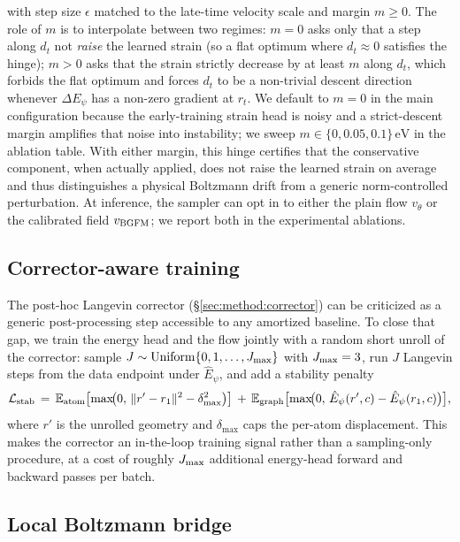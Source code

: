 \documentclass{article}
\begin{document}
with step size $\epsilon$ matched to the late-time velocity scale and
margin $m \ge 0$. The role of $m$ is to interpolate between two
regimes: $m = 0$ asks only that a step along $d_t$ not \emph{raise} the
learned strain (so a flat optimum where $d_t \approx 0$ satisfies the
hinge); $m > 0$ asks that the strain strictly decrease by at least $m$
along $d_t$, which forbids the flat optimum and forces $d_t$ to be a
non-trivial descent direction whenever $\Delta E_\psi$ has a non-zero
gradient at $r_t$. We default to $m = 0$ in the main configuration
because the early-training strain head is noisy and a strict-descent
margin amplifies that noise into instability; we sweep $m \in
\{0, 0.05, 0.1\}\,\mathrm{eV}$ in the ablation table. With either
margin, this hinge certifies that the conservative component, when
actually applied, does not raise the learned strain on average and thus
distinguishes a physical Boltzmann drift from a generic norm-controlled
perturbation. At inference, the sampler can opt in to either the plain
flow $v_\theta$ or the calibrated field $v_{\rm BGFM}$; we report both
in the experimental ablations.

\subsection{Corrector-aware training}
\label{sec:method:corrector-aware}

The post-hoc Langevin corrector (\S\ref{sec:method:corrector}) can be
criticized as a generic post-processing step accessible to any
amortized baseline. To close that gap, we train the energy head and
the flow jointly with a random short unroll of the corrector:
sample $J \sim {\rm Uniform}\{0, 1, \ldots, J_{\rm max}\}$ with
$J_{\rm max} = 3$, run $J$ Langevin steps from the data endpoint
under $\hat E_\psi$, and add a stability penalty
\begin{equation}
    \mathcal L_{\rm stab} \,=\, \mathbb E_{\rm atom}\bigl[\max\!\bigl(0,\,\|r' - r_1\|^2 - \delta_{\max}^2\bigr)\bigr]
    \,+\, \mathbb E_{\rm graph}\bigl[\max\!\bigl(0,\, \hat E_\psi(r', c) - \hat E_\psi(r_1, c)\bigr)\bigr],
    \label{eq:corrector-aware-loss}
\end{equation}
where $r'$ is the unrolled geometry and $\delta_{\max}$ caps the
per-atom displacement. This makes the corrector an in-the-loop
training signal rather than a sampling-only procedure, at a cost of
roughly $J_{\rm max}$ additional energy-head forward and backward
passes per batch.

\subsection{Local Boltzmann bridge}
\label{sec:method:bridge}
\end{document}
